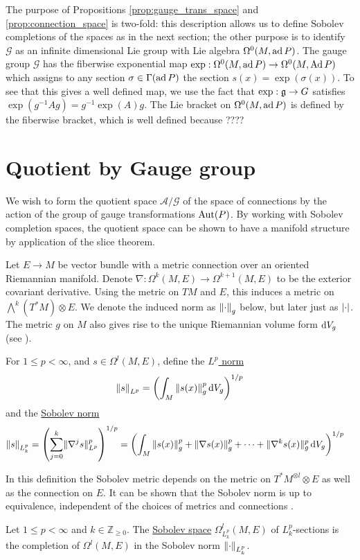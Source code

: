 The purpose of Propositions \ref{prop:gauge_trans_space} and
\ref{prop:connection_space} is two-fold: this description allows us to 
define Sobolev completions of the spaces as in the next section; the other 
purpose is to identify $\mathcal{G}$ as an infinite dimensional Lie group with 
Lie algebra $\Omega^0(M,\operatorname{ad} P)$.
The gauge group $\mathcal{G}$ has  
the fiberwise exponential map $\exp : \Omega^0(M,\operatorname{ad} P) \to
\Omega^0(M,\operatorname{Ad} P)$ which assigns to any section  $\sigma \in \Gamma(\operatorname{ad} P)$ the
section  $s(x)=\exp(\sigma(x))$. To see that this gives a well defined map, we
use the fact that  $\exp : \operatorname{\mathfrak{g}} \to G$ satisfies
$\exp(g^{-1}Ag)=g^{-1}\exp(A)g$. The Lie bracket on $\Omega^0(M,\operatorname{ad} P)$ is
defined by the fiberwise bracket, which is well defined because ????




\section{Quotient by Gauge group}
We wish to form the quotient space $\mathcal{A} /\mathcal{G}$ 
of the space of connections by the action of
the group of gauge transformations $\operatorname{Aut}(P)$. By working with Sobolev completion
spaces, the quotient space can be shown to have a manifold structure by 
application of the slice theorem.

Let $E\to M$ be vector bundle with a metric connection over an oriented 
Riemannian manifold. 
Denote $\nabla : \Omega^k(M,E) \to \Omega^{k+1}(M,E)$ to be the exterior
covariant derivative. Using the metric on $TM$ and  $E$, this induces a
metric on  $\bigwedge^k(T^*M)\otimes E$. We denote the induced norm as 
$\norm{\cdot}_g$ below, but later just as $\abs{\cdot}$.
The metric $g$ on $M$ also gives rise to the unique Riemannian volume form 
$\odif{V}_g$ (see \cite[Prop 2.41]{riemannian_manifolds}).
\begin{defn}
    For $1 \leq p < \infty$, and $s \in \Omega^l(M,E)$, 
	define the \underline{$L^p$ norm}
	\[
		 \norm{s}_{L^p} = \paren{\int_M \norm{s(x)}^p_g \odif{V}_g}^{1 /p}
	\] 
	and the \underline{Sobolev norm}
	\begin{align*}
		\norm{s}_{L^p_k} 
		&= \paren{\sum_{j=0}^{k} \norm[*]{\nabla^j s}_{L^p}^p }^{1 /p} 
		= \paren{ \int_M \norm{s(x)}^p_g + \norm{\nabla s(x)}^p_g + \cdots
		+ \norm[*]{\nabla^k s(x)}^p_g \odif{V}_g}^{1 /p} 
	\end{align*}
\end{defn}
In this definition the Sobolev metric depends on the metric on $T^*M^{\otimes
l}\otimes E$ as well as the connection on $E$. It can be shown that the Sobolev
norm is up to equivalence, independent of the choices of metrics and connections
\cite[Lemma 11.22]{math_for_physics}.
\begin{defn}
	Let $1\leq p < \infty$ and  $k\in \mathbb{Z}_{\geq 0}$. The
	\underline{Sobolev
	space} $\Omega^l_{L^p_k}(M,E)$ of $L^p_k$-sections is the completion of
	$\Omega^l(M,E)$ in the Sobolev norm  $\norm{\cdot}_{L^p_k}$.
\end{defn}

